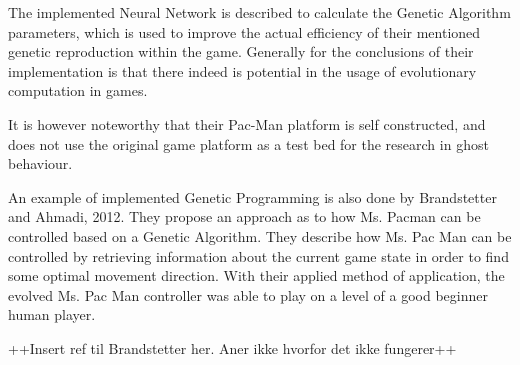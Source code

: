 The implemented Neural Network is described to calculate the Genetic Algorithm parameters, which is used to improve the actual efficiency of their mentioned genetic reproduction within the game. Generally for the conclusions of their implementation is that there indeed is potential in the usage of evolutionary computation in games.

It is however noteworthy that their Pac-Man platform is self constructed, and does not use the original game platform as a test bed for the research in ghost behaviour.

An example of implemented Genetic Programming is also done by Brandstetter and Ahmadi, 2012. They propose an approach as to how Ms. Pacman can be controlled based on a Genetic Algorithm.
They describe how Ms. Pac Man can be controlled by retrieving information about the current game state in order to find some optimal movement direction.
With their applied method of application, the evolved Ms. Pac Man controller was able to play on a level of a good beginner human player.


++Insert ref til Brandstetter her. Aner ikke hvorfor det ikke fungerer++